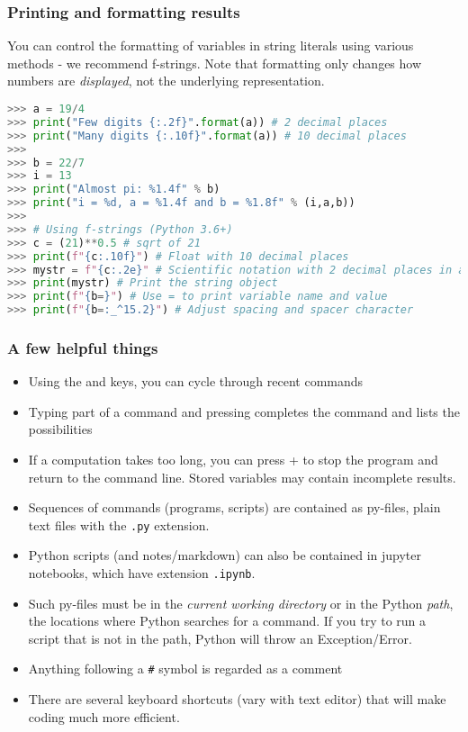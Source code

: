 \begin{frame}[fragile]
  \frametitle{Printing and formatting results}
  You can control the formatting of variables in string literals using various methods - we recommend f-strings. Note that formatting only changes how numbers are \emph{displayed}, not the underlying representation.

  \begin{lstlisting}[language=Python,numbers=none]
>>> a = 19/4
>>> print("Few digits {:.2f}".format(a)) # 2 decimal places
>>> print("Many digits {:.10f}".format(a)) # 10 decimal places
>>> 
>>> b = 22/7
>>> i = 13
>>> print("Almost pi: %1.4f" % b)
>>> print("i = %d, a = %1.4f and b = %1.8f" % (i,a,b))
>>>
>>> # Using f-strings (Python 3.6+)
>>> c = (21)**0.5 # sqrt of 21
>>> print(f"{c:.10f}") # Float with 10 decimal places
>>> mystr = f"{c:.2e}" # Scientific notation with 2 decimal places in a string object
>>> print(mystr) # Print the string object
>>> print(f"{b=}") # Use = to print variable name and value
>>> print(f"{b=:_^15.2}") # Adjust spacing and spacer character
  \end{lstlisting}
\end{frame}
 
 {\nologo
 \begin{frame}[fragile]
  \frametitle{A few helpful things}
  \begin{itemize}[<+->]
    \item Using the \keystroke{$\uparrow$} and \keystroke{$\downarrow$} keys, you can cycle through recent commands
    \item Typing part of a command and pressing  completes the command and lists the possibilities
    \item If a computation takes too long, you can press + to stop the program and return to the command line. Stored variables may contain incomplete results.
    \item Sequences of commands (programs, scripts) are contained as py-files, plain text files with the \lstinline$.py$ extension.
    \item Python scripts (and notes/markdown) can also be contained in jupyter notebooks, which have extension \lstinline$.ipynb$.
    \item Such py-files must be in the \emph{current working directory} or in the Python \emph{path}, the locations where Python searches for a command. If you try to run a script that is not in the path, Python will throw an Exception/Error.
    \item Anything following a \lstinline$#$ symbol is regarded as a comment
    \item There are several keyboard shortcuts (vary with text editor) that will make coding much more efficient.
  \end{itemize}
\end{frame}
}

